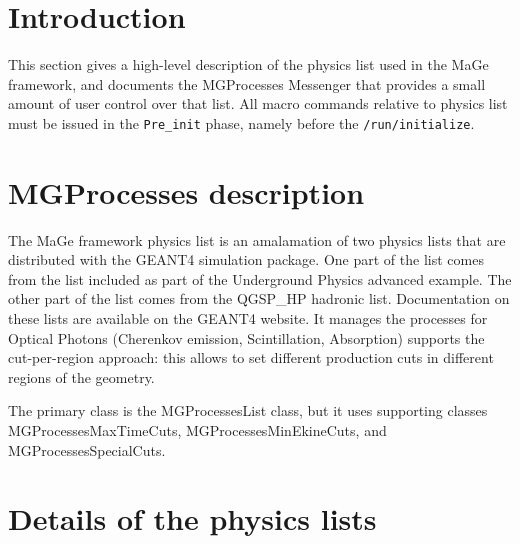\section{Introduction}

This section gives a high-level description of the physics list used
in the MaGe framework, and documents the MGProcesses Messenger that
provides a small amount of user control over that list. All macro commands 
relative to physics list must be issued in the \texttt{Pre\_init} phase, 
namely before the \texttt{/run/initialize}. 
 
\section{MGProcesses description}
The MaGe framework physics list is an amalamation of two physics lists
that are distributed with the GEANT4 simulation package. One part of
the list comes from the list included as part of the Underground
Physics advanced example. The other part of the list comes from the
QGSP\_HP hadronic list. Documentation on these lists are available on
the GEANT4 website. It manages the processes for Optical Photons 
(Cherenkov emission, Scintillation, Absorption) supports the cut-per-region 
approach: this allows to set different production cuts in different regions 
of the geometry.

The primary class is the MGProcessesList class, but it uses
supporting classes MGProcessesMaxTimeCuts, MGProcessesMinEkineCuts,
and MGProcessesSpecialCuts.

\section{Details of the physics lists}
